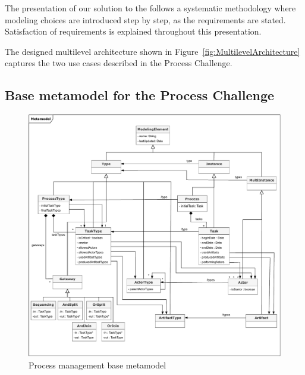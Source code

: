 
The presentation of our solution to the \mpc follows a systematic methodology where modeling choices are introduced step by step, as the requirements are stated. Satisfaction of requirements is explained throughout this presentation.


The designed multilevel architecture shown in Figure~\ref{fig:MultilevelArchitecture} captures the two use cases described in the Process Challenge.


\subsection{Base metamodel for the Process Challenge}

\begin{figure}
 \centering
    \includegraphics[width=1.0 \textwidth]{Figures/Metamodel.pdf}
     \caption{Process management base metamodel}
    \label{fig:BaseMetamodel}
\end{figure}

